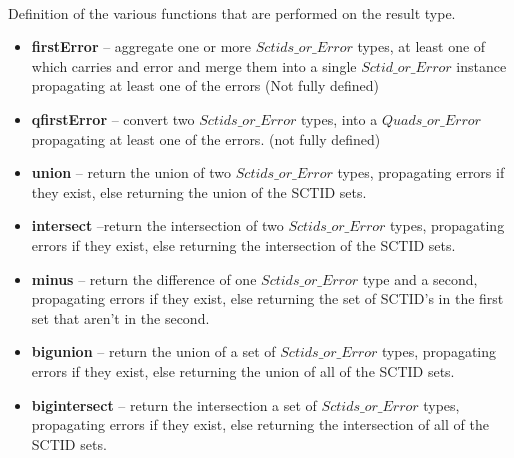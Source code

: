 \documentclass{article}
\begin{document}
\paragraph{}
Definition of the various functions that are performed on the result type. \\
\begin{itemize}[noitemsep,nolistsep]
\item \textbf{firstError} -- aggregate one or more $Sctids\_or\_Error$ types, at least one of which carries and error and merge them into a single $Sctid\_or\_Error$ instance propagating at least one of the errors (Not fully defined)
\item \textbf{qfirstError} -- convert two $Sctids\_or\_Error$ types, into a $Quads\_or\_Error$ propagating at least one of the errors. (not fully defined)
\end{itemize}

\begin{itemize}[noitemsep]
\item \textbf{union} -- return the union of two $Sctids\_or\_Error$ types, propagating errors if they exist, else returning the union of the SCTID sets.
\item \textbf{intersect} --return the intersection of two $Sctids\_or\_Error$ types, propagating errors if they exist, else returning the intersection of the SCTID sets.
\item \textbf{minus} -- return the difference of one $Sctids\_or\_Error$ type and a second, propagating errors if they exist, else returning the set of SCTID's in the first set that aren't in the second. 
\item \textbf{bigunion} -- return the union of a set of $Sctids\_or\_Error$ types, propagating errors if they exist, else returning the union of  all of the SCTID sets.
\item \textbf{bigintersect} -- return the intersection a set of $Sctids\_or\_Error$ types, propagating errors if they exist, else returning the intersection of all of  the SCTID sets.
\end{itemize}
\end{document}
